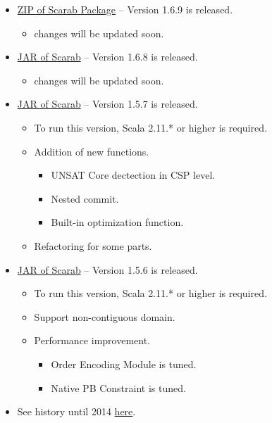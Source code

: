 \documentclass[11pt]{article}
\begin{document}
\begin{itemize}
\item\relax [2015.06.14] \href{./scarab-v1-6-9.zip}{ZIP of Scarab Package} -- Version 1.6.9 is released.
\label{sec-2-0-1}
\begin{itemize}
\item changes will be updated soon.
\end{itemize}

\item\relax [2015.05.25] \href{./scarab168.jar}{JAR of Scarab} -- Version 1.6.8 is released.
\label{sec-2-0-2}
\begin{itemize}
\item changes will be updated soon.
\end{itemize}
\item\relax [2015.02.08] \href{./scarab-v1-5-7.jar}{JAR of Scarab} -- Version 1.5.7 is released.
\label{sec-2-0-3}
\begin{itemize}
\item To run this version, Scala 2.11.* or higher is required.
\item Addition of new functions.
\begin{itemize}
\item UNSAT Core dectection in CSP level.
\item Nested commit.
\item Built-in optimization function.
\end{itemize}
\item Refactoring for some parts.
\end{itemize}

\item\relax [2015.01.09] \href{./scarab-v1-5-6.jar}{JAR of Scarab} -- Version 1.5.6 is released.
\label{sec-2-0-4}
\begin{itemize}
\item To run this version, Scala 2.11.* or higher is required.
\item Support non-contiguous domain.
\item Performance improvement.
\begin{itemize}
\item Order Encoding Module is tuned.
\item Native PB Constraint is tuned.
\end{itemize}
\end{itemize}

\item See history until 2014 \href{./history.html}{here}.
\label{sec-2-0-5}
\end{itemize}
\end{document}
